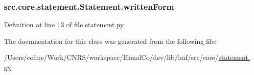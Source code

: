 \hypertarget{classsrc_1_1core_1_1statement_1_1_statement_a754fb4718f6f6a7999094cedb98716cb}{
\subsubsection[{written\+Form}]{\setlength{\rightskip}{0pt plus 5cm}src.\+core.\+statement.\+Statement.\+written\+Form}}\label{classsrc_1_1core_1_1statement_1_1_statement_a754fb4718f6f6a7999094cedb98716cb}


Definition at line 13 of file statement.\+py.



The documentation for this class was generated from the following file\+:\begin{DoxyCompactItemize}
\item 
/\+Users/celine/\+Work/\+C\+N\+R\+S/workspace/\+Himal\+Co/dev/lib/lmf/src/core/\hyperlink{statement_8py}{statement.\+py}\end{DoxyCompactItemize}
